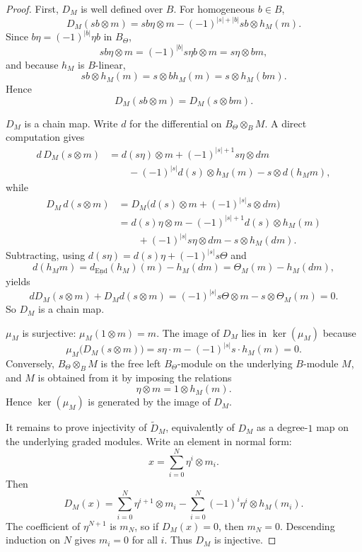 \begin{proof}
First, $D_{M}$ is well defined over \(B\).
For homogeneous \(b\in B\),
\[
D_{M}(sb\otimes m)
=
sb\eta\otimes m-(-1)^{|s|+|b|}sb\otimes h_{M}(m).
\]
Since \(b\eta=(-1)^{|b|}\eta b\) in \(B_{\Theta}\),
\[
sb\eta\otimes m=(-1)^{|b|}s\eta b\otimes m=s\eta\otimes bm,
\]
and because \(h_{M}\) is \(B\)-linear,
\[
sb\otimes h_{M}(m)=s\otimes bh_{M}(m)=s\otimes h_{M}(bm).
\]
Hence
\[
D_{M}(sb\otimes m)=D_{M}(s\otimes bm).
\]

$D_{M}$ is a chain map.
Write \(d\) for the differential on \(B_{\Theta}\otimes_{B}M\).
A direct computation gives
\begin{align*}
d\,D_{M}(s\otimes m)
&=
d(s\eta)\otimes m+(-1)^{|s|+1}s\eta\otimes dm
\\
&\qquad
-(-1)^{|s|}d(s)\otimes h_{M}(m)-s\otimes d(h_{M}m),
\end{align*}
while
\begin{align*}
D_{M}\,d(s\otimes m)
&=
D_{M}\big(d(s)\otimes m+(-1)^{|s|}s\otimes dm\big)
\\
&=
d(s)\eta\otimes m-(-1)^{|s|+1}d(s)\otimes h_{M}(m)
\\
&\qquad
+(-1)^{|s|}s\eta\otimes dm-s\otimes h_{M}(dm).
\end{align*}
Subtracting, using \(d(s\eta)=d(s)\eta+(-1)^{|s|}s\Theta\) and
\[
d(h_{M}m)=d_{\underline{\operatorname{End}}}(h_{M})(m)-h_{M}(dm)=\Theta_{M}(m)-h_{M}(dm),
\]
yields
\[
dD_{M}(s\otimes m)+D_{M}d(s\otimes m)=
(-1)^{|s|}s\Theta\otimes m-s\otimes \Theta_{M}(m)=0.
\]
So \(D_{M}\) is a chain map.

\(\mu_{M}\) is surjective: \(\mu_M(1 \otimes m) = m\).
The image of \(D_{M}\) lies in \(\ker(\mu_{M})\) because
\[
\mu_{M}\big(D_{M}(s\otimes m)\big)
=s\eta\cdot m-(-1)^{|s|}s\cdot h_{M}(m)=0.
\]
Conversely, \(B_{\Theta}\otimes_{B}M\) is the free left \(B_{\Theta}\)-module on the underlying \(B\)-module \(M\), and \(M\) is obtained from it by imposing the relations
\[
\eta\otimes m=1\otimes h_{M}(m).
\]
Hence \(\ker(\mu_{M})\) is generated by the image of \(D_{M}\).

It remains to prove injectivity of \(\widetilde D_{M}\), equivalently of \(D_{M}\) as a degree-\(1\) map on the underlying graded modules.
Write an element in normal form:
\[
x=\sum_{i=0}^{N}\eta^{i}\otimes m_{i}.
\]
Then
\[
D_{M}(x)=\sum_{i=0}^{N}\eta^{i+1}\otimes m_{i}-\sum_{i=0}^{N}(-1)^{i}\eta^{i}\otimes h_{M}(m_{i}).
\]
The coefficient of \(\eta^{N+1}\) is \(m_{N}\), so if \(D_{M}(x)=0\), then \(m_{N}=0\).
Descending induction on \(N\) gives \(m_{i}=0\) for all \(i\).
Thus \(D_{M}\) is injective.
\end{proof}

